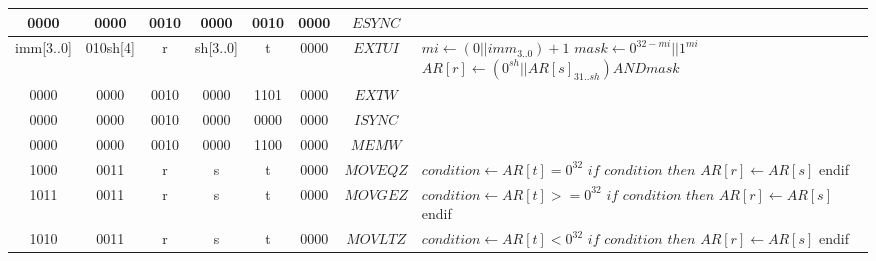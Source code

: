 \begin{smalltables}
\begin{longtable}{llllllllllllllllllllllll  p{1cm}  p{6cm} | }
		\multicolumn{4}{|c|}{0000} & \multicolumn{4}{c|}{0000} & \multicolumn{4}{c|}{0010} & \multicolumn{4}{c|}{0000} & \multicolumn{4}{c|}{0010} & \multicolumn{4}{c|}{0000} & \multicolumn{1}{c|}{$ESYNC$} &  \\ \hline
		\multicolumn{4}{|c|}{imm[3..0]} & \multicolumn{4}{c|}{010sh[4]} & \multicolumn{4}{c|}{r} & \multicolumn{4}{c|}{sh[3..0]} & \multicolumn{4}{c|}{t} & \multicolumn{4}{c|}{0000} & \multicolumn{1}{c|}{$EXTUI$} & $mi \leftarrow (0 || imm_{3..0}) + 1$ \newline $mask \leftarrow 0^{32-mi} || 1^{mi}$ \newline $AR[r] \leftarrow (0^{sh} || AR[s]_{31..sh}) AND mask$ \\ \hline
		\multicolumn{4}{|c|}{0000} & \multicolumn{4}{c|}{0000} & \multicolumn{4}{c|}{0010} & \multicolumn{4}{c|}{0000} & \multicolumn{4}{c|}{1101} & \multicolumn{4}{c|}{0000} & \multicolumn{1}{c|}{$EXTW$} &  \\ \hline	
		\multicolumn{4}{|c|}{0000} & \multicolumn{4}{c|}{0000} & \multicolumn{4}{c|}{0010} & \multicolumn{4}{c|}{0000} & \multicolumn{4}{c|}{0000} & \multicolumn{4}{c|}{0000} & \multicolumn{1}{c|}{$ISYNC$} &  \\ \hline
		\multicolumn{4}{|c|}{0000} & \multicolumn{4}{c|}{0000} & \multicolumn{4}{c|}{0010} & \multicolumn{4}{c|}{0000} & \multicolumn{4}{c|}{1100} & \multicolumn{4}{c|}{0000} & \multicolumn{1}{c|}{$MEMW$} &  \\ \hline
		\multicolumn{4}{|c|}{1000} & \multicolumn{4}{c|}{0011} & \multicolumn{4}{c|}{r} & \multicolumn{4}{c|}{s} & \multicolumn{4}{c|}{t} & \multicolumn{4}{c|}{0000} & \multicolumn{1}{c|}{$MOVEQZ$} & $condition \leftarrow AR[t] = 0^{32}$ \newline $if$ $condition$  $then$ \newline $AR[r] \leftarrow AR[s]$ \newline endif \\ \hline
		\multicolumn{4}{|c|}{1011} & \multicolumn{4}{c|}{0011} & \multicolumn{4}{c|}{r} & \multicolumn{4}{c|}{s} & \multicolumn{4}{c|}{t} & \multicolumn{4}{c|}{0000} & \multicolumn{1}{c|}{$MOVGEZ$} & $condition \leftarrow AR[t] >= 0^{32}$ \newline $if$ $condition$  $then$ \newline $AR[r] \leftarrow AR[s]$ \newline endif \\ \hline
		\multicolumn{4}{|c|}{1010} & \multicolumn{4}{c|}{0011} & \multicolumn{4}{c|}{r} & \multicolumn{4}{c|}{s} & \multicolumn{4}{c|}{t} & \multicolumn{4}{c|}{0000} & \multicolumn{1}{c|}{$MOVLTZ$} & $condition \leftarrow AR[t] < 0^{32}$ \newline $if$ $condition$  $then$ \newline $AR[r] \leftarrow AR[s]$ \newline endif \\ \hline

\end{longtable}
\end{smalltables}
